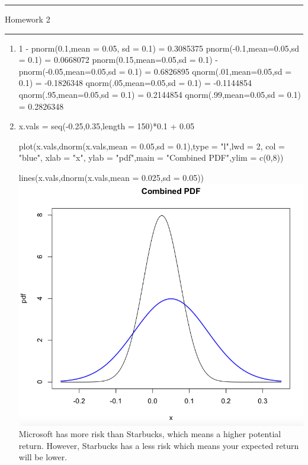 \documentclass[letterpaper,12pt]{article}
\begin{document}
\thispagestyle{empty}

\hrule \vspace{0.5em}
 \hfill Homework 2 \newline \hrule

\vspace{1em}

\begin{enumerate}
\item
{} 1 - pnorm(0.1,mean = 0.05, sd = 0.1) = 0.3085375
 pnorm(-0.1,mean=0.05,sd = 0.1) = 0.0668072
 pnorm(0.15,mean=0.05,sd = 0.1) - pnorm(-0.05,mean=0.05,sd = 0.1) = 0.6826895
 qnorm(.01,mean=0.05,sd = 0.1) = -0.1826348
 qnorm(.05,mean=0.05,sd = 0.1) = -0.1144854
 qnorm(.95,mean=0.05,sd = 0.1) = 0.2144854
 qnorm(.99,mean=0.05,sd = 0.1) = 0.2826348
\item 
x.vals = seq(-0.25,0.35,length = 150)*0.1 + 0.05

plot(x.vals,dnorm(x.vals,mean = 0.05,sd = 0.1),type = "l",lwd = 2, col = "blue", xlab = "x", ylab = "pdf",main = "Combined PDF",ylim = c(0,8))

lines(x.vals,dnorm(x.vals,mean = 0.025,sd = 0.05))\\
\includegraphics[scale = 0.5]{PDF} \\
Microsoft has more risk than Starbucks, which means a higher potential return. However, Starbucks has a less risk which means your expected return will be lower.


\end{enumerate}
\end{document}
